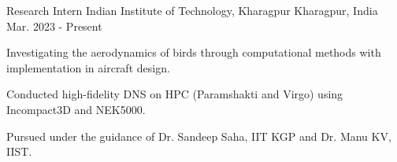 

\begin{cventries}

  \cventry
  {Research Intern} %
  {Indian Institute of Technology, Kharagpur} %
  {Kharagpur, India} %
  {Mar. 2023 - Present} %
  {
    \begin{cvitems} %
      \item {Investigating the aerodynamics of birds through computational methods with implementation in aircraft design.}
      \item {Conducted high-fidelity DNS on HPC (Paramshakti and Virgo) using Incompact3D and NEK5000.}
      \item{Pursued under the guidance of Dr. Sandeep Saha, IIT KGP and Dr. Manu KV, IIST.}
    \end{cvitems}
  }
\end{cventries}

